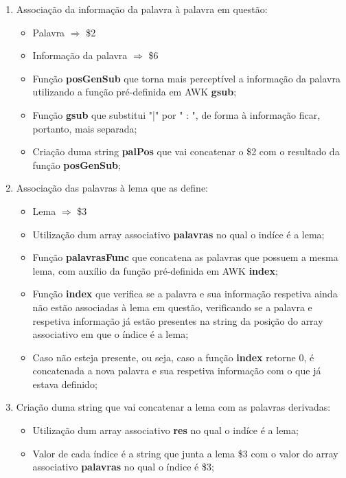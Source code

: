 \documentclass[11pt,a4paper]{report}
\begin{document}
\begin{enumerate}
	\item Associação da informação da palavra à palavra em questão:
		\begin{itemize}
			\item Palavra $\Rightarrow$ \$2
			\item Informação da palavra $\Rightarrow$ \$6
			\item Função \textbf{posGenSub} que torna mais perceptível a informação da palavra utilizando a função pré-definida em AWK \textbf{gsub};
			\item Função \textbf{gsub} que substitui "|" por "\hspace{0.12cm} : ", de forma à informação ficar, portanto, mais separada;
			\item Criação duma string \textbf{palPos} que vai concatenar o \$2 com o resultado da função \textbf{posGenSub};
		\end{itemize}
	\item Associação das palavras à lema que as define:
		\begin{itemize}
			\item Lema $\Rightarrow$ \$3
			\item Utilização dum array associativo \textbf{palavras} no qual o indíce é a lema;
			\item Função \textbf{palavrasFunc} que concatena as palavras que possuem a mesma lema, com auxílio da função pré-definida em AWK \textbf{index};
			\item Função \textbf{index} que verifica se a palavra e sua informação respetiva ainda não estão associadas à lema em questão, verificando se a palavra e respetiva informação já estão presentes na string da posição do array associativo em que o índice é a lema;
			\item Caso não esteja presente, ou seja, caso a função \textbf{index} retorne 0, é concatenada a nova palavra e sua respetiva informação com o que já estava definido;
		\end{itemize}
	\item Criação duma string que vai concatenar a lema com as palavras derivadas:
		\begin{itemize}
			\item Utilização dum array associativo \textbf{res} no qual o indíce é a lema;
			\item Valor de cada índice é a string que junta a lema \$3 com o valor do array associativo \textbf{palavras} no qual o índice é \$3;
		\end{itemize}
\end{enumerate}
\end{document}
